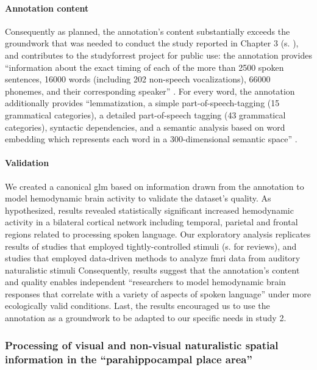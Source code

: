 \paragraph{Annotation content}
%
Consequently as planned, the annotation's content substantially exceeds the
groundwork that was needed to conduct the study reported in Chapter 3 (s.
\citep{haeusler2022processing}), and contributes to the studyforrest project for
public use:
the annotation provides ``information about the exact timing of each of the more
than 2500 spoken sentences, 16000 words (including 202 non-speech
vocalizations), 66000 phonemes, and their corresponding speaker''
\citep{haeusler2021speechanno}.
%
For every word, the annotation additionally provides ``lemmatization, a simple
part-of-speech-tagging (15 grammatical categories), a detailed part-of-speech
tagging (43 grammatical categories), syntactic dependencies, and a semantic
analysis based on word embedding which represents each word in a 300-dimensional
semantic space'' \citep{haeusler2021speechanno}.


\paragraph{Validation}

We created a canonical \ac{glm} based on information drawn from the annotation
to model hemodynamic brain activity to validate the dataset's quality.
As hypothesized, results revealed statistically significant increased
hemodynamic activity in a bilateral cortical network including temporal,
parietal and frontal regions related to processing spoken language.
Our exploratory analysis replicates results of studies that employed
tightly-controlled stimuli (s. \citep{friederici2011brain,
hickok2007cortical,price2012twentyyears} for reviews), and studies that employed
data-driven methods to analyze \ac{fmri} data from auditory naturalistic stimuli
\citep{honey2012not, lerner2011topographic, silbert2014coupled}
Consequently, results suggest that the annotation's content and quality enables
independent ``researchers to model hemodynamic brain responses that correlate
with a variety of aspects of spoken language'' \citep{haeusler2021speechanno}
under more ecologically valid conditions.
Last, the results encouraged us to use the annotation as a groundwork to be
adapted to our specific needs in study 2.


\subsubsection{Processing of visual and non-visual naturalistic spatial
information in the ``parahippocampal place area''}


